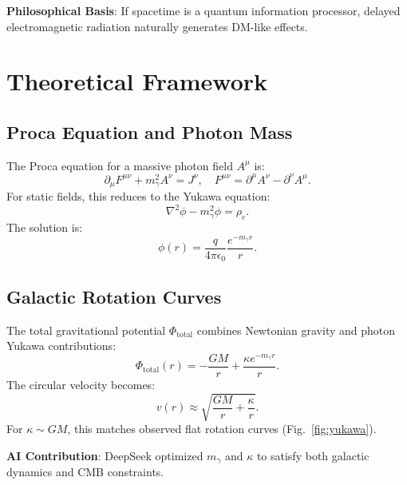 \documentclass[12pt, a4paper]{article}
\begin{document}
\textbf{Philosophical Basis}: If spacetime is a quantum information processor, delayed electromagnetic radiation naturally generates DM-like effects.  

\section{Theoretical Framework}  
\label{sec:theory}  

\subsection{Proca Equation and Photon Mass}  
\label{subsec:proca}  

The Proca equation for a massive photon field \( A^\mu \) is:  
\begin{equation}  
\partial_\mu F^{\mu\nu} + m_\gamma^2 A^\nu = J^\nu, \quad F^{\mu\nu} = \partial^\mu A^\nu - \partial^\nu A^\mu.  
\label{eq:proca}  
\end{equation}  
For static fields, this reduces to the Yukawa equation:  
\begin{equation}  
\nabla^2 \phi - m_\gamma^2 \phi = \rho_e.  
\label{eq:yukawa}  
\end{equation}  
The solution is:  
\begin{equation}  
\phi(r) = \frac{q}{4\pi \epsilon_0} \frac{e^{-m_\gamma r}}{r}.  
\label{eq:yukawa_sol}  
\end{equation}  

\subsection{Galactic Rotation Curves}  
\label{subsec:rotation}  

The total gravitational potential \( \Phi_{\text{total}} \) combines Newtonian gravity and photon Yukawa contributions:  
\begin{equation}  
\Phi_{\text{total}}(r) = -\frac{GM}{r} + \frac{\kappa e^{-m_\gamma r}}{r}.  
\label{eq:total_potential}  
\end{equation}  
The circular velocity becomes:  
\begin{equation}  
v(r) \approx \sqrt{\frac{GM}{r} + \frac{\kappa}{r}}.  
\label{eq:velocity}  
\end{equation}  
For \( \kappa \sim GM \), this matches observed flat rotation curves (Fig.~\ref{fig:yukawa}).  

\textbf{AI Contribution}: DeepSeek optimized \( m_\gamma \) and \( \kappa \) to satisfy both galactic dynamics and CMB constraints.  
\end{document}
